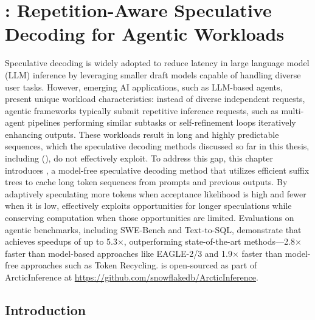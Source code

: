 \chapter{\SuffixDecoding: Repetition-Aware Speculative Decoding for Agentic Workloads}
\label{ch:suffixdecoding}

\providecommand{\sdMaxSpec}{\texttt{MAX\_SPEC}\xspace}
\providecommand{\sdCount}{\texttt{COUNT}}
\providecommand{\sdChildren}{\texttt{CHILDREN}}
\providecommand{\sdParent}{\texttt{PARENT}}
\providecommand{\sdToken}{\texttt{TOKEN}}
\providecommand{\sdScore}{\texttt{SCORE}}

Speculative decoding is widely adopted to reduce latency in large language model (LLM) inference by leveraging smaller draft models capable of handling diverse user tasks. However, emerging AI applications, such as LLM-based agents, present unique workload characteristics: instead of diverse independent requests, agentic frameworks typically submit repetitive inference requests, such as multi-agent pipelines performing similar subtasks or self-refinement loops iteratively enhancing outputs. These workloads result in long and highly predictable sequences, which the speculative decoding methods discussed so far in this thesis, including \SpecInfer (), do not effectively exploit. To address this gap, this chapter introduces \SuffixDecoding, a model-free speculative decoding method that utilizes efficient suffix trees to cache long token sequences from prompts and previous outputs. By adaptively speculating more tokens when acceptance likelihood is high and fewer when it is low, \SuffixDecoding effectively exploits opportunities for longer speculations while conserving computation when those opportunities are limited. Evaluations on agentic benchmarks, including SWE-Bench and Text-to-SQL, demonstrate that \SuffixDecoding achieves speedups of up to 5.3$\times$, outperforming state-of-the-art methods---2.8$\times$ faster than model-based approaches like EAGLE-2/3 and 1.9$\times$ faster than model-free approaches such as Token Recycling. \SuffixDecoding is open-sourced as part of ArcticInference at \url{https://github.com/snowflakedb/ArcticInference}.

\section{Introduction}
\label{suffixdecoding:sec:intro}

